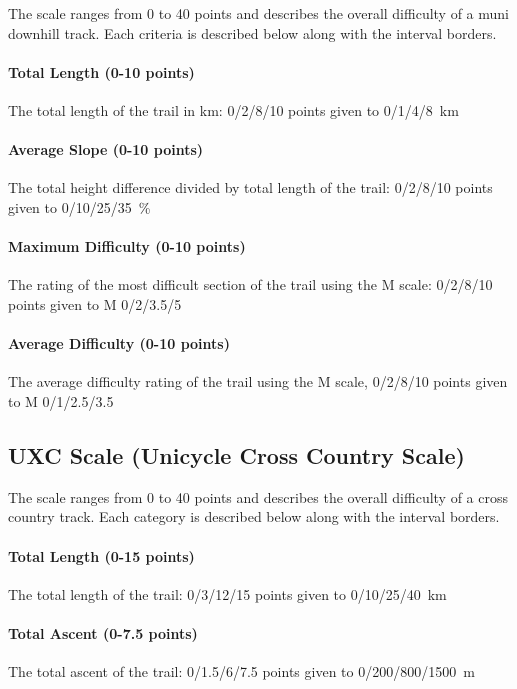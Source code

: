 \documentclass[a4paper,oneside]{scrartcl}
\begin{document}
The scale ranges from 0 to 40 points and describes the overall difficulty of a
muni downhill track. Each criteria is described below along with the
interval borders.

\paragraph{Total Length (0-10 points)}
\hangindent=1cm
The total length of the trail in km: 0/2/8/10 points given to 0/1/4/8~km

\paragraph{Average Slope (0-10 points)}
\hangindent=1cm
The total height difference divided by total length of the trail: 0/2/8/10
points given to 0/10/25/35~\%

\paragraph{Maximum Difficulty (0-10 points)}
\hangindent=1cm
The rating of the most difficult section of the trail using the M scale:
0/2/8/10 points given to M 0/2/3.5/5

\paragraph{Average Difficulty (0-10 points)}
\hangindent=1cm
The average difficulty rating of the trail using the M scale, 0/2/8/10 points
given to M 0/1/2.5/3.5



\subsection{UXC Scale (Unicycle Cross Country Scale)}
\label{sec:uxc-scale}
The scale ranges from 0 to 40 points and describes the overall difficulty of a
cross country track. Each category is described below along with the
interval borders.


\paragraph{Total Length (0-15 points)}
\hangindent=1cm
The total length of the trail: 0/3/12/15 points given to 0/10/25/40~km

\paragraph{Total Ascent (0-7.5 points)} 
\hangindent=1cm
The total ascent of the trail: 0/1.5/6/7.5 points given to 0/200/800/1500~m
\end{document}
